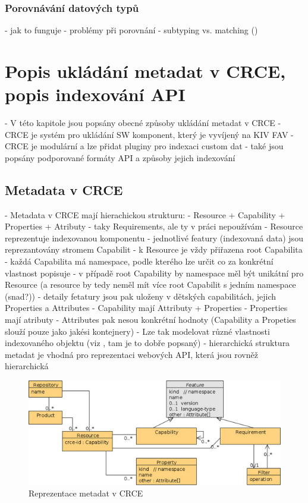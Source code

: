 \documentclass[czech,DP]{thesiskiv}
\begin{document}
\subsection{Porovnávání datových typů}

 - jak to funguje
 - problémy při porovnání
 - subtyping vs. matching (\cite{abadi1995subytping})


\chapter{Popis ukládání metadat v CRCE, popis indexování API}

 - V této kapitole jsou popsány obecné způsoby ukládání metadat v CRCE \cite{brada2015repository}
 - CRCE je systém pro ukládání SW komponent, který je vyvíjený na KIV FAV
 - CRCE je modulární a lze přidat pluginy pro indexaci custom dat
 - také jsou popsány podporované formáty API a způsoby jejich indexování

\section{Metadata v CRCE}

 - Metadata v CRCE mají hierachickou strukturu:
	 - Resource + Capability + Properties + Atributy
	 - taky Requirements, ale ty v práci nepoužívám
	 - Resource reprezentuje indexovanou komponentu
	 - jednotlivé featury (indexovaná data) jsou reprezantovány stromem Capabilit
	 	- k Resource je vždy přiřazena root Capabilita
	 	- každá Capabilita má namespace, podle kterého lze určit co za konkrétní vlastnost popisuje
	 	- v případě root Capability by namespace měl být unikátní pro Resource (a resource by tedy neměl mít více root Capabilit s jedním namespace (snad?))
	 	- detaily fetatury jsou pak uloženy v dětských capabilitách, jejich Properties a Attributes
 - Capability mají Attributy + Properties
 - Properties mají atributy
 - Attributes pak nesou konkrétní hodnoty (Capability a Propeties slouží pouze jako jakési kontejnery)
 - Lze tak modelovat různé vlastnosti indexovaného objektu (viz \cite{brada2015repository}, tam je to dobře popsaný)
 - hierarchická struktura metadat je vhodná pro reprezentaci webových API, která jsou rovněž hierarchická
 
 \begin{figure}[h]
 	\centering
 	\includegraphics{resource-uml}
 	\caption{Reprezentace metadat v CRCE}
 	\label{fig:crce-resource-uml}
 \end{figure}
\end{document}
